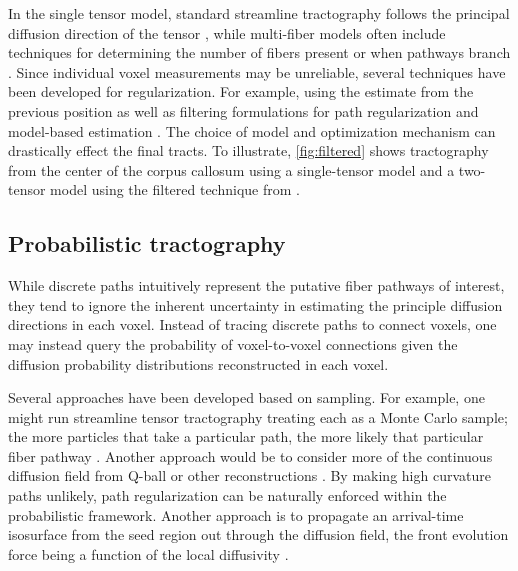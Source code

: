 \documentclass[final,hyperref]{gatech-thesis}
\begin{document}
In the single tensor model, standard streamline tractography follows the
principal diffusion direction of the tensor \cite{Mori2002}, while multi-fiber
models often include techniques for determining the number of fibers present
or when pathways branch \cite{Hagmann2004,Kreher2005,Guo2006}.
%
Since individual voxel measurements may be unreliable, several techniques have
been developed for regularization.  For example, using the estimate from the
previous position \cite{Lazar2003,Zhukov2002} as well as filtering
formulations for path regularization \cite{Gossl2002} and model-based
estimation \cite{malcolm2009ipmi}.
%
The choice of model and optimization mechanism can drastically effect the
final tracts.  To illustrate, \autoref{fig:filtered} shows tractography from
the center of the corpus callosum using a single-tensor model and a two-tensor
model using the filtered technique from \cite{malcolm2009ipmi}.



\subsection{Probabilistic tractography}

While discrete paths intuitively represent the putative fiber pathways of
interest, they tend to ignore the inherent uncertainty in estimating the
principle diffusion directions in each voxel.
%
Instead of tracing discrete paths to connect voxels, one may instead query the
probability of voxel-to-voxel connections given the diffusion probability
distributions reconstructed in each voxel.

Several approaches have been developed based on sampling.  For example, one
might run streamline tensor tractography treating each as a Monte Carlo
sample; the more particles that take a particular path, the more likely that
particular fiber pathway \cite{Koch2002,Behrens2003,Parker2003,Bjornemo2002}.
Another approach would be to consider more of the continuous diffusion field
from Q-ball or other reconstructions
\cite{Tuch2000,Batchelor2001,Perrin2005,Parker2005,Friman2006,Zhang2009}.  By
making high curvature paths unlikely, path regularization can be naturally
enforced within the probabilistic framework.
%
Another approach is to propagate an arrival-time isosurface from the seed
region out through the diffusion field, the front evolution force being a
function of the local diffusivity
\cite{Batchelor2001,Campbell2005,Tournier2003}.
\end{document}
